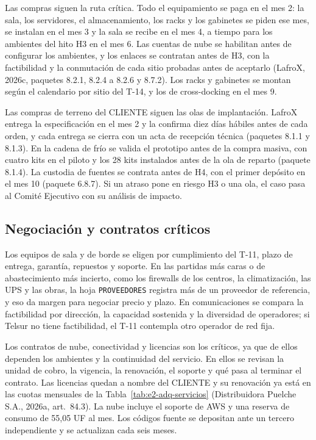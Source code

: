 Las compras siguen la ruta crítica. Todo el equipamiento se paga en el mes 2: la sala, los servidores, el almacenamiento, los racks y los gabinetes se piden ese mes, se instalan en el mes 3 y la sala se recibe en el mes 4, a tiempo para los ambientes del hito H3 en el mes 6. Las cuentas de nube se habilitan antes de configurar los ambientes, y los enlaces se contratan antes de H3, con la factibilidad y la conmutación de cada sitio probadas antes de aceptarlo (LafroX, 2026c, paquetes 8.2.1, 8.2.4 a 8.2.6 y 8.7.2). Los racks y gabinetes se montan según el calendario por sitio del T-14, y los de cross-docking en el mes 9.

Las compras de terreno del CLIENTE siguen las olas de implantación. LafroX entrega la especificación en el mes 2 y la confirma diez días hábiles antes de cada orden, y cada entrega se cierra con un acta de recepción técnica (paquetes 8.1.1 y 8.1.3). En la cadena de frío se valida el prototipo antes de la compra masiva, con cuatro kits en el piloto y los 28 kits instalados antes de la ola de reparto (paquete 8.1.4). La custodia de fuentes se contrata antes de H4, con el primer depósito en el mes 10 (paquete 6.8.7). Si un atraso pone en riesgo H3 o una ola, el caso pasa al Comité Ejecutivo con su análisis de impacto.

\subsection{Negociación y contratos críticos}
\label{sec:e2-adq-negociacion}

Los equipos de sala y de borde se eligen por cumplimiento del T-11, plazo de entrega, garantía, repuestos y soporte. En las partidas más caras o de abastecimiento más incierto, como los firewalls de los centros, la climatización, las UPS y las obras, la hoja \texttt{PROVEEDORES} registra más de un proveedor de referencia, y eso da margen para negociar precio y plazo. En comunicaciones se compara la factibilidad por dirección, la capacidad sostenida y la diversidad de operadores; si Telsur no tiene factibilidad, el T-11 contempla otro operador de red fija.

Los contratos de nube, conectividad y licencias son los críticos, ya que de ellos dependen los ambientes y la continuidad del servicio. En ellos se revisan la unidad de cobro, la vigencia, la renovación, el soporte y qué pasa al terminar el contrato. Las licencias quedan a nombre del CLIENTE y su renovación ya está en las cuotas mensuales de la Tabla~\ref{tab:e2-adq-servicios} (Distribuidora Puelche S.A., 2026a, art.~84.3). La nube incluye el soporte de AWS y una reserva de consumo de 55,05 UF al mes. Los códigos fuente se depositan ante un tercero independiente y se actualizan cada seis meses.

